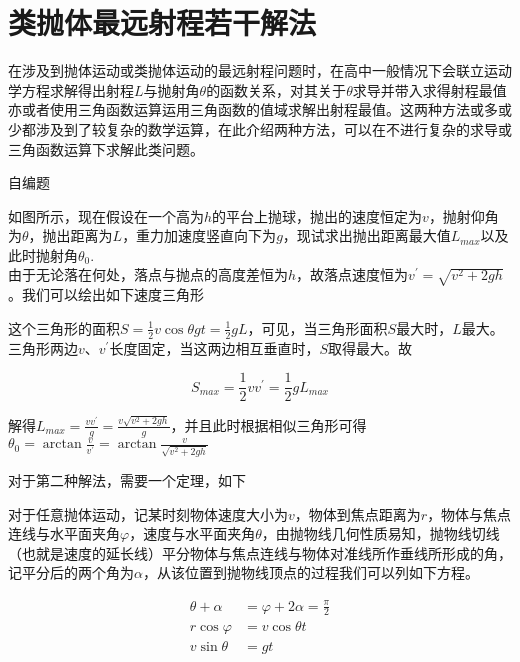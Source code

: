 \section{类抛体最远射程若干解法}

在涉及到抛体运动或类抛体运动的最远射程问题时，在高中一般情况下会联立运动学方程求解得出射程$L$与抛射角$\theta$的函数关系，对其关于$\theta$求导并带入求得射程最值亦或者使用三角函数运算运用三角函数的值域求解出射程最值。这两种方法或多或少都涉及到了较复杂的数学运算，在此介绍两种方法，可以在不进行复杂的求导或三角函数运算下求解此类问题。


\begin{ep}{自编题}{}



如图所示，现在假设在一个高为$h$的平台上抛球，抛出的速度恒定为$v$，抛射仰角为$\theta$，抛出距离为$L$，重力加速度竖直向下为$g$，现试求出抛出距离最大值$L_{max}$以及此时抛射角$\theta_0$.
~\\

由于无论落在何处，落点与抛点的高度差恒为$h$，故落点速度恒为$v^{\prime} = \sqrt{v^2 + 2gh}$。我们可以绘出如下速度三角形



这个三角形的面积$S=\frac{1}{2} v \cos \theta gt = \frac{1}{2} g L$，可见，当三角形面积$S$最大时，$L$最大。三角形两边$v$、$v^{\prime}$长度固定，当这两边相互垂直时，$S$取得最大。故

$$S_{max} = \frac{1}{2} v v^{\prime} = \frac{1}{2} g L_{max}$$

解得$L_{max} = \frac{v v^{\prime}}{g} = \frac{v\sqrt{v^2 + 2gh}}{g}$，并且此时根据相似三角形可得$\theta_0 = \arctan{\frac{v}{v^{\prime}}} = \arctan{\frac{v}{\sqrt{v^2 + 2gh}}}$

\end{ep}

对于第二种解法，需要一个定理，如下



对于任意抛体运动，记某时刻物体速度大小为$v$，物体到焦点距离为$r$，物体与焦点连线与水平面夹角$\varphi$，速度与水平面夹角$\theta$，由抛物线几何性质易知，抛物线切线（也就是速度的延长线）平分物体与焦点连线与物体对准线所作垂线所形成的角，记平分后的两个角为$\alpha$，从该位置到抛物线顶点的过程我们可以列如下方程。

\begin{subequations}
\begin{align*}
\theta + \alpha &= \varphi + 2 \alpha = \frac{\pi}{2} \\
r \cos \varphi &= v \cos \theta t \\
v \sin \theta &= gt 
\end{align*}
\end{subequations}

